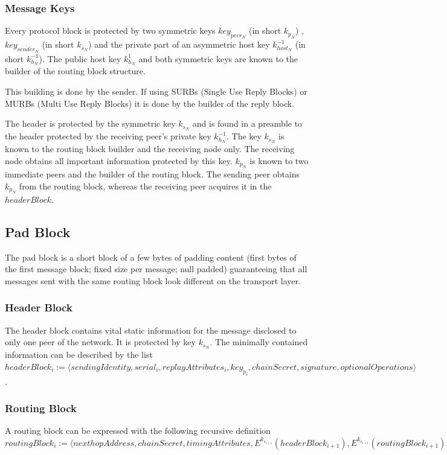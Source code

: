 \documentclass[9pt,journal,compsoc]{IEEEtran}
\begin{document}
\subsubsection{Message Keys}
Every protocol block is protected by two symmetric keys $key_{peer_N}$ (in short $k_{p_N}$) , $key_{sender_N}$ (in short $k_{s_N}$) and the private part of an asymmetric host key $k^{-1}_{host_N}$ (in short $k^{-1}_{h_N}$). The public host key $k^{1}_{h_N}$ and both symmetric keys are known to the builder of the routing block structure. 

This building is done by the sender. If using SURBs (Single Use Reply Blocks) or MURBs (Multi Use Reply Blocks) it is done by the builder of the reply block. 

The header is protected by the symmetric key $k_{s_N}$ and is found in a preamble to the header protected by the receiving peer's private key $k^{-1}_{h_N}$. The key $k_{s_N}$ is known to the routing block builder and the receiving node only. The receiving node obtains all important information protected by this key. $k_{p_N}$ is known to two immediate peers and the builder of the routing block. The sending peer obtains $k_{p_N}$ from the routing block, whereas the receiving peer acquires it in the $headerBlock$. 

\subsection{Pad Block}
The pad block is a short block of a few bytes of padding content (first bytes of the first message block; fixed size per message; null padded) guaranteeing that all messages sent with the same routing block look different on the transport layer.

\subsubsection{Header Block}
The header block contains vital static information for the message disclosed to only one peer of the network. It is protected by key $k_{s_N}$. The minimally contained information can be described by the list $headerBlock_i:=\langle sendingIdentity,\allowbreak{} serial_i,\allowbreak{} replayAttributes_i,\allowbreak{} key_{p_i},\allowbreak{} chainSecret,\allowbreak{} signature,\allowbreak{} optionalOperations \rangle$.

\subsubsection{Routing Block}
A routing block can be expressed with the following recursive definition $routingBlock_i:=\langle\allowbreak{} nexthopAddress,\allowbreak{} chainSecret,\allowbreak{} timingAttributes,\allowbreak{} E^{k_{s_{i+1}}}\left(headerBlock_{i+1}\right),\allowbreak{} E^{k_{s_{i+1}}}\left(routingBlock_{i+1}\right),\allowbreak{} payloadBuildInstructions_i,\allowbreak{} payloadId,\allowbreak{} optionalReplyBlocks \rangle$
\end{document}
